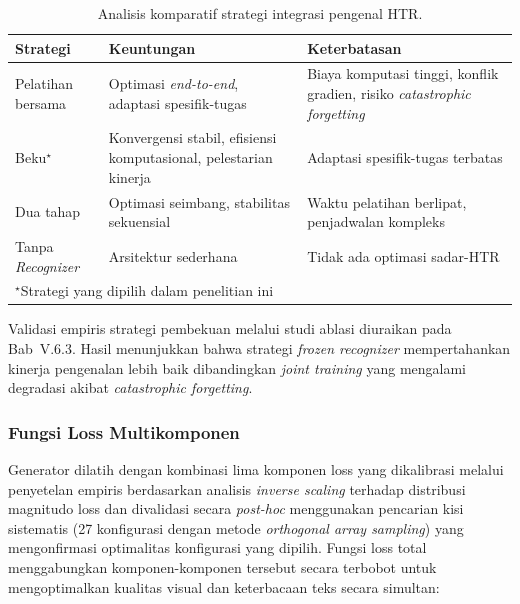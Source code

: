 \begin{table}[H]
  \caption[Analisis komparatif strategi integrasi pengenal HTR]{Analisis komparatif strategi integrasi pengenal HTR.}
  \label{table:recognizer_strategy_comparison}
  \small
  \renewcommand{\arraystretch}{1.2}

  \begin{tabular}{|p{2.2cm}|p{5.2cm}|p{5.2cm}|}
    \hline
    \textbf{Strategi}           & \textbf{Keuntungan}                                              & \textbf{Keterbatasan}                                                     \\
    \hline
    Pelatihan bersama           & Optimasi \textit{end-to-end}, adaptasi spesifik-tugas            & Biaya komputasi tinggi, konflik gradien, risiko \textit{catastrophic forgetting} \\
    \hline
    Beku$^\star$                & Konvergensi stabil, efisiensi komputasional, pelestarian kinerja & Adaptasi spesifik-tugas terbatas                                      \\
    \hline
    Dua tahap                   & Optimasi seimbang, stabilitas sekuensial                         & Waktu pelatihan berlipat, penjadwalan kompleks                        \\
    \hline
    Tanpa \textit{Recognizer}   & Arsitektur sederhana                                             & Tidak ada optimasi sadar-HTR                                          \\
    \hline
    \multicolumn{3}{|l|}{\footnotesize $^\star$Strategi yang dipilih dalam penelitian ini}                                                              \\
    \hline
  \end{tabular}
\end{table}

Validasi empiris strategi pembekuan melalui studi ablasi diuraikan pada Bab~V.6.3. Hasil menunjukkan bahwa strategi \textit{frozen recognizer} mempertahankan kinerja pengenalan lebih baik dibandingkan \textit{joint training} yang mengalami degradasi akibat \textit{catastrophic forgetting}.


\subsubsection{Fungsi Loss Multikomponen}
\label{subsubsec:fungsi-loss-multikomponen}

Generator dilatih dengan kombinasi lima komponen loss yang dikalibrasi melalui penyetelan empiris berdasarkan analisis \textit{inverse scaling} terhadap distribusi magnitudo loss dan divalidasi secara \textit{post-hoc} menggunakan pencarian kisi sistematis (27 konfigurasi dengan metode \textit{orthogonal array sampling}) yang mengonfirmasi optimalitas konfigurasi yang dipilih. Fungsi loss total menggabungkan komponen-komponen tersebut secara terbobot untuk mengoptimalkan kualitas visual dan keterbacaan teks secara simultan:

